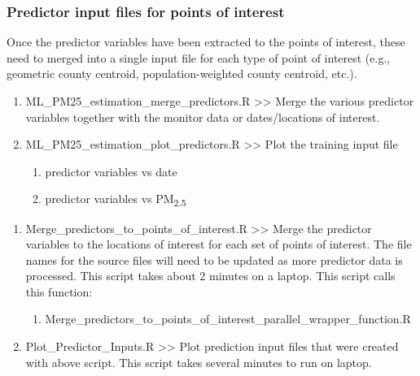 \subsubsection{Predictor input files for points of interest}

Once the predictor variables have been extracted to the points of interest, these need to merged into a single input file for each type of point of interest (e.g., geometric county centroid, population-weighted county centroid, etc.).

\begin{enumerate}

\item ML\_PM25\_estimation\_merge\_predictors.R >>  Merge the various predictor variables together with the monitor data or dates/locations of interest. %


\item ML\_PM25\_estimation\_plot\_predictors.R >> Plot the training input file %
	\begin{enumerate}
		\item predictor variables vs date
		\item predictor variables vs PM\textsubscript{2.5}
	\end{enumerate}

\end{enumerate}


\begin{enumerate}
\item Merge\_predictors\_to\_points\_of\_interest.R >> Merge the predictor variables to the locations of interest for each set of points of interest. The file names for the source files will need to be updated as more predictor data is processed. This script takes about 2 minutes on a laptop. This script calls this function:

	\begin{enumerate}
	\item Merge\_predictors\_to\_points\_of\_interest\_parallel\_wrapper\_function.R
	\end{enumerate}

\item Plot\_Predictor\_Inputs.R >> Plot prediction input files that were created with above script. This script takes several minutes to run on laptop. 

\end{enumerate}